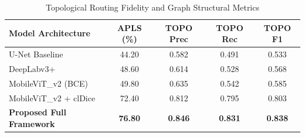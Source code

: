 \documentclass[conference]{IEEEtran}
\begin{document}
\begin{table}[t]
\centering
\caption{Quantitative Performance Benchmarks on Held-Out Rural Test Dataset}
\label{tab:pixel_metrics}
\end{table}

\begin{table}[t]
\centering
\caption{Topological Routing Fidelity and Graph Structural Metrics}
\label{tab:topo_metrics}
\begin{tabular}{lcccc}
\toprule
\textbf{Model Architecture} & \textbf{APLS (\%)} & \textbf{TOPO Prec} & \textbf{TOPO Rec} & \textbf{TOPO F1} \\
\midrule
U-Net Baseline~\cite{ronneberger2015unet} & 44.20 & 0.582 & 0.491 & 0.533 \\
DeepLabv3+~\cite{chen2017deeplab} & 48.60 & 0.614 & 0.528 & 0.568 \\
MobileViT\_v2 (BCE) & 49.80 & 0.635 & 0.542 & 0.585 \\
MobileViT\_v2 + clDice & 72.40 & 0.812 & 0.795 & 0.803 \\
\textbf{Proposed Full Framework} & \textbf{76.80} & \textbf{0.846} & \textbf{0.831} & \textbf{0.838} \\
\bottomrule
\end{tabular}
\end{table}
\end{document}
